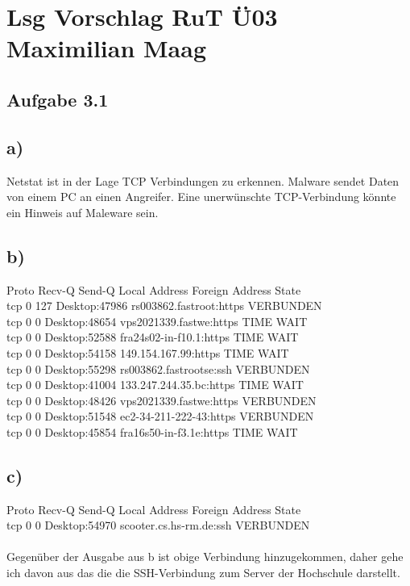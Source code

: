 \documentclass{article}
\begin{document}
	\section*{Lsg Vorschlag RuT Ü03 Maximilian Maag}
	\subsection*{Aufgabe 3.1}
	\subsection*{a)}
	Netstat ist in der Lage TCP Verbindungen zu erkennen. Malware sendet Daten von einem PC an einen Angreifer. Eine unerwünschte TCP-Verbindung könnte ein Hinweis auf Maleware sein. 
	\subsection*{b)}
	Proto Recv-Q Send-Q Local Address           Foreign Address         State   \\   
	tcp        0    127 Desktop:47986           rs003862.fastroot:https VERBUNDEN \\ 
	tcp        0      0 Desktop:48654           vps2021339.fastwe:https TIME WAIT  \\
	tcp        0      0 Desktop:52588           fra24s02-in-f10.1:https TIME WAIT  \\
	tcp        0      0 Desktop:54158           149.154.167.99:https    TIME WAIT  \\
	tcp        0      0 Desktop:55298           rs003862.fastrootse:ssh VERBUNDEN  \\
	tcp        0      0 Desktop:41004           133.247.244.35.bc:https TIME WAIT  \\
	tcp        0      0 Desktop:48426           vps2021339.fastwe:https VERBUNDEN  \\
	tcp        0      0 Desktop:51548           ec2-34-211-222-43:https VERBUNDEN  \\
	tcp        0      0 Desktop:45854           fra16s50-in-f3.1e:https TIME WAIT 
	\subsection*{c)}
	Proto Recv-Q Send-Q Local Address           Foreign Address         State     \\ 
	tcp        0      0 Desktop:54970           scooter.cs.hs-rm.de:ssh VERBUNDEN \\ \\
	Gegenüber der Ausgabe aus b ist obige Verbindung hinzugekommen, daher gehe ich davon aus das die die SSH-Verbindung zum Server der Hochschule darstellt. 
\end{document}
